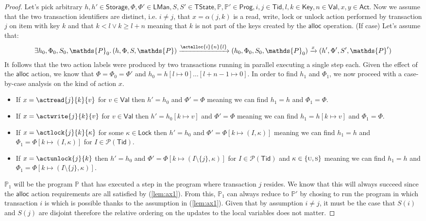 \begin{proof}
Let's pick arbitrary $h, h' \in \mathsf{Storage}, \Phi, \Phi' \in \mathsf{LMan}, S, S' \in \mathsf{TState}, \mathds{P}, \mathds{P}' \in \mathsf{Prog}, i, j \in \mathsf{Tid}, l, k \in \mathsf{Key}, n \in \mathsf{Val}, x, y \in \mathsf{Act}$. Now we assume that the two transaction identifiers are distinct, i.e. $i \neq j$, that $x = \alpha(j, k)$ is a read, write, lock or unlock action performed by transaction $j$ on item with key $k$ and that $k < l \lor k \geq l + n$ meaning that $k$ is not part of the keys created by the $\mathsf{alloc}$ operation. (If case) Let's assume that:
\begin{gather} \label{lem:ax1}
	\exists h_0, \Phi_0, S_0, \mathds{P}_0 \ldotp 
	(h, \Phi, S, \mathds{P}) \xrightarrow{\actalloc{i}{n}{l}} (h_0, \Phi_0, S_0, \mathds{P}_0)  \xrightarrow{x} (h', \Phi', S', \mathds{P}')
\end{gather}
It follows that the two action labels were produced by two transactions running in parallel executing a single step each. Given the effect of the $\mathsf{alloc}$ action, we know that $\Phi = \Phi_0 = \Phi'$ and $h_0 = h[l \mapsto 0]\ldots[l + n - 1 \mapsto 0]$. In order to find $h_1$ and $\Phi_1$, we now proceed with a case-by-case analysis on the kind of action $x$.
\begin{itemize}
	\item If $x = \actread{j}{k}{v}$ for $v \in \mathsf{Val}$ then $h' = h_0$ and $\Phi' = \Phi$ meaning we can find $h_1 = h$ and $\Phi_1 = \Phi$.
	\item If $x = \actwrite{j}{k}{v}$ for $v \in \mathsf{Val}$ then $h' = h_0[k \mapsto v]$ and $\Phi' = \Phi$ meaning we can find $h_1 = h[k \mapsto v]$ and $\Phi_1 = \Phi$.
	\item If $x = \actlock{j}{k}{\kappa}$ for some $\kappa \in \mathsf{Lock}$ then $h' = h_0$ and $\Phi' = \Phi[k \mapsto (I, \kappa)]$ meaning we can find $h_1 = h$ and $\Phi_1 = \Phi[k \mapsto (I, \kappa)]$ for $I \in \mathcal{P}(\mathsf{Tid})$.
	\item If $x = \actunlock{j}{k}$ then $h' = h_0$ and $\Phi' = \Phi[k \mapsto (I \setminus \{j\}, \kappa)]$ for $I \in \mathcal{P}(\mathsf{Tid})$ and $\kappa \in \{\textsc{u}, \textsc{s}\}$ meaning we can find $h_1 = h$ and $\Phi_1 = \Phi[k \mapsto (I \setminus \{j\}, \kappa)]$.
\end{itemize}
$\mathds{P}_1$ will be the program $\mathds{P}$ that has executed a step in the program where transaction $j$ resides. We know that this will always succeed since the $\mathsf{alloc}$ action requirements are all satisfied by (\ref{lem:ax1}). From this, $\mathds{P}_1$ can always reduce to $\mathds{P}'$ by chosing to run the program in which transaction $i$ is which is possible thanks to the assumption in (\ref{lem:ax1}). Given that by assumption $i \neq j$, it must be the case that $S(i)$ and $S(j)$ are disjoint therefore the relative ordering on the updates to the local variables does not matter.
\end{proof}
\fi

